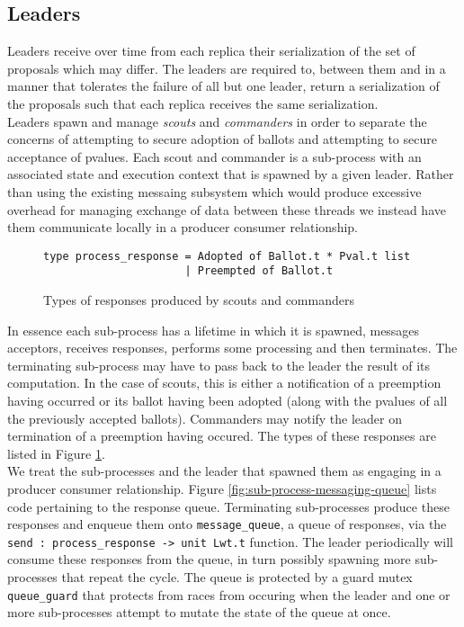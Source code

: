 \subsection{Leaders}

Leaders receive over time from each replica their serialization of the set of proposals which may differ. The leaders are required to, between them and in a manner that tolerates the failure of all but one leader, return a serialization of the proposals such that each replica receives the same serialization. \\

Leaders spawn and manage \emph{scouts} and \emph{commanders} in order to separate the concerns of attempting to secure adoption of ballots and attempting to secure acceptance of pvalues. Each scout and commander is a sub-process with an associated state and execution context that is spawned by a given leader. Rather than using the existing messaing subsystem which would produce excessive overhead for managing exchange of data between these threads we instead have them communicate locally in a producer consumer relationship. \\

\begin{figure}
  \begin{lstlisting}
type process_response = Adopted of Ballot.t * Pval.t list
                      | Preempted of Ballot.t    
  \end{lstlisting}
  \caption{Types of responses produced by scouts and commanders}
  \label{fig:sub-process-responses}
\end{figure}

In essence each sub-process has a lifetime in which it is spawned, messages acceptors, receives responses, performs some processing and then terminates. The terminating sub-process may have to pass back to the leader the result of its computation. In the case of scouts, this is either a notification of a preemption having occurred or its ballot having been adopted (along with the pvalues of all the previously accepted ballots). Commanders may notify the leader on termination of a preemption having occured. The types of these responses are listed in Figure \ref{fig:sub-process-responses}. \\

We treat the sub-processes and the leader that spawned them as engaging in a producer consumer relationship. Figure \ref{fig:sub-process-messaging-queue} lists code pertaining to the response queue. Terminating sub-processes produce these responses and enqueue them onto \texttt{message\_queue}, a queue of responses, via the \texttt{send : process\_response -> unit Lwt.t} function. The leader periodically will consume these responses from the queue, in turn possibly spawning more sub-processes that repeat the cycle. The queue is protected by a guard mutex \texttt{queue\_guard} that protects from races from occuring when the leader and one or more sub-processes attempt to mutate the state of the queue at once. \\

